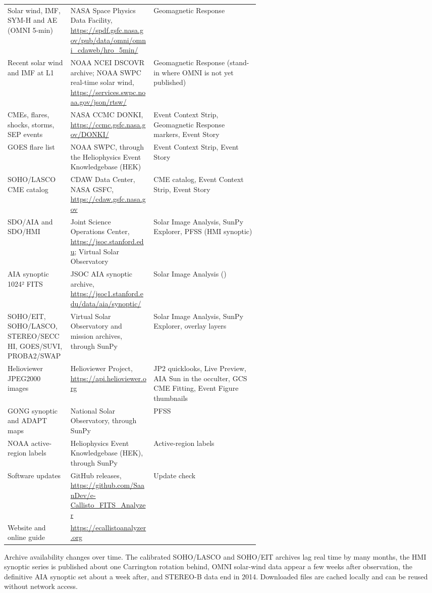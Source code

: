 {\begin{xltabular}{\linewidth}{@{}P{0.25\linewidth} P{0.33\linewidth} L@{}}
  Solar wind, IMF, SYM-H and AE (OMNI 5-min) & NASA Space Physics Data Facility, \url{https://spdf.gsfc.nasa.gov/pub/data/omni/omni_cdaweb/hro_5min/} & Geomagnetic Response \\
  Recent solar wind and IMF at L1 & NOAA NCEI DSCOVR archive; NOAA SWPC real-time solar wind, \url{https://services.swpc.noaa.gov/json/rtsw/} & Geomagnetic Response (stand-in where OMNI is not yet published) \\
  CMEs, flares, shocks, storms, SEP events & NASA CCMC DONKI, \url{https://ccmc.gsfc.nasa.gov/DONKI/} & Event Context Strip, Geomagnetic Response markers, Event Story \\
  GOES flare list & NOAA SWPC, through the Heliophysics Event Knowledgebase (HEK) & Event Context Strip, Event Story \\
  SOHO/LASCO CME catalog & CDAW Data Center, NASA GSFC, \url{https://cdaw.gsfc.nasa.gov} & CME catalog, Event Context Strip, Event Story \\
  SDO/AIA and SDO/HMI & Joint Science Operations Center, \url{https://jsoc.stanford.edu}; Virtual Solar Observatory & Solar Image Analysis, SunPy Explorer, PFSS (HMI synoptic) \\
  AIA synoptic 1024² FITS & JSOC AIA synoptic archive, \url{https://jsoc1.stanford.edu/data/aia/synoptic/} & Solar Image Analysis () \\
  SOHO/EIT, SOHO/LASCO, STEREO/SECCHI, GOES/SUVI, PROBA2/SWAP & Virtual Solar Observatory and mission archives, through SunPy & Solar Image Analysis, SunPy Explorer, overlay layers \\
  Helioviewer JPEG2000 images & Helioviewer Project, \url{https://api.helioviewer.org} & JP2 quicklooks, Live Preview, AIA Sun in the occulter, GCS CME Fitting, Event Figure thumbnails \\
  GONG synoptic and ADAPT maps & National Solar Observatory, through SunPy & PFSS \\
  NOAA active-region labels & Heliophysics Event Knowledgebase (HEK), through SunPy & Active-region labels \\
  Software updates & GitHub releases, \url{https://github.com/SaanDev/e-Callisto_FITS_Analyzer} & Update check \\
  Website and online guide & \url{https://ecallistoanalyzer.org} &  \\
  \bottomrule
\end{xltabular}}

\begin{note}
  Archive availability changes over time. The calibrated SOHO/LASCO and SOHO/EIT archives lag
  real time by many months, the HMI synoptic series is published about one Carrington rotation
  behind, OMNI solar-wind data appear a few weeks after observation, the definitive AIA
  synoptic set about a week after, and STEREO-B data end in 2014. Downloaded files are cached locally and can be
  reused without network access.
\end{note}
